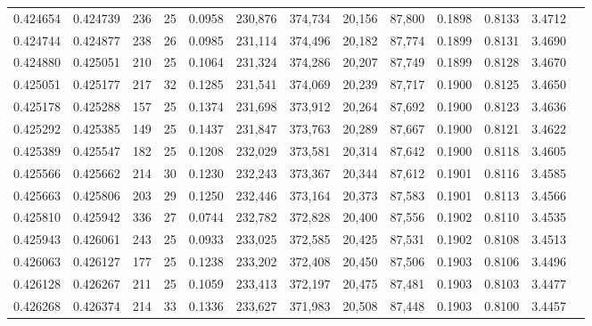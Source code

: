 \begin{tabular}{rrrrrrrrrrrrr}
0.424654 & 0.424739 & 236 &  25 &                                     0.0958 & 230,876 & 374,734 &  20,156 &  87,800 & 0.1898 & 0.8133 & 3.4712 \\
0.424744 & 0.424877 & 238 &  26 &                                     0.0985 & 231,114 & 374,496 &  20,182 &  87,774 & 0.1899 & 0.8131 & 3.4690 \\
0.424880 & 0.425051 & 210 &  25 &                                     0.1064 & 231,324 & 374,286 &  20,207 &  87,749 & 0.1899 & 0.8128 & 3.4670 \\
0.425051 & 0.425177 & 217 &  32 &                                     0.1285 & 231,541 & 374,069 &  20,239 &  87,717 & 0.1900 & 0.8125 & 3.4650 \\
0.425178 & 0.425288 & 157 &  25 &                                     0.1374 & 231,698 & 373,912 &  20,264 &  87,692 & 0.1900 & 0.8123 & 3.4636 \\
0.425292 & 0.425385 & 149 &  25 &                                     0.1437 & 231,847 & 373,763 &  20,289 &  87,667 & 0.1900 & 0.8121 & 3.4622 \\
0.425389 & 0.425547 & 182 &  25 &                                     0.1208 & 232,029 & 373,581 &  20,314 &  87,642 & 0.1900 & 0.8118 & 3.4605 \\
0.425566 & 0.425662 & 214 &  30 &                                     0.1230 & 232,243 & 373,367 &  20,344 &  87,612 & 0.1901 & 0.8116 & 3.4585 \\
0.425663 & 0.425806 & 203 &  29 &                                     0.1250 & 232,446 & 373,164 &  20,373 &  87,583 & 0.1901 & 0.8113 & 3.4566 \\
0.425810 & 0.425942 & 336 &  27 &                                     0.0744 & 232,782 & 372,828 &  20,400 &  87,556 & 0.1902 & 0.8110 & 3.4535 \\
0.425943 & 0.426061 & 243 &  25 &                                     0.0933 & 233,025 & 372,585 &  20,425 &  87,531 & 0.1902 & 0.8108 & 3.4513 \\
0.426063 & 0.426127 & 177 &  25 &                                     0.1238 & 233,202 & 372,408 &  20,450 &  87,506 & 0.1903 & 0.8106 & 3.4496 \\
0.426128 & 0.426267 & 211 &  25 &                                     0.1059 & 233,413 & 372,197 &  20,475 &  87,481 & 0.1903 & 0.8103 & 3.4477 \\
0.426268 & 0.426374 & 214 &  33 &                                     0.1336 & 233,627 & 371,983 &  20,508 &  87,448 & 0.1903 & 0.8100 & 3.4457 \\

\end{tabular}

